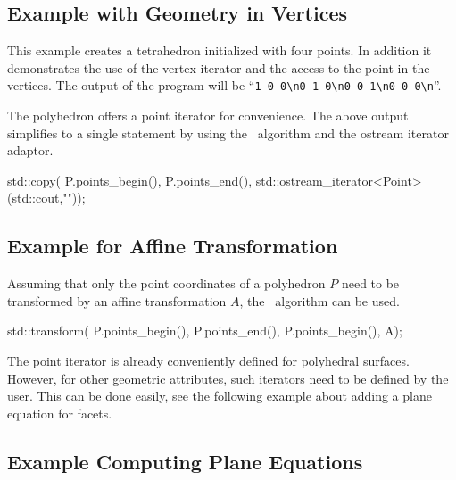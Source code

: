 \newpage
{}

\subsection{Example with Geometry in Vertices}

This example creates a tetrahedron initialized with four points. In
addition it demonstrates the use of the vertex iterator and the access
to the point in the vertices. The output of
the program will be ``\verb|1 0 0\n0 1 0\n0 0 1\n0 0 0\n|''.


The polyhedron offers a point iterator for convenience. The above
output simplifies to a single statement by using the \stl\ algorithm
 and the ostream iterator adaptor.

\begin{ccExampleCode}
std::copy( P.points_begin(), P.points_end(), 
           std::ostream_iterator<Point>(std::cout,"\n"));
\end{ccExampleCode}

\subsection{Example for Affine Transformation}

Assuming that only the point coordinates of a polyhedron $P$ need to
be transformed by an affine transformation $A$, the \stl\ algorithm
 can be used. 

\begin{ccExampleCode}
std::transform( P.points_begin(), P.points_end(), P.points_begin(), A);
\end{ccExampleCode}

The point iterator is already conveniently defined for polyhedral
surfaces. However, for other geometric attributes, such iterators
need to be defined by the user. This can be done easily, see the
following example about adding a plane equation for facets.


\subsection{Example Computing Plane Equations}

